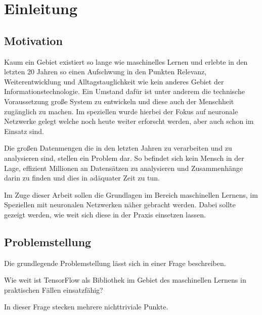 \chapter{Einleitung}
\label{cha:Einleitung}

\section{Motivation}

Kaum ein Gebiet existiert so lange wie maschinelles Lernen und erlebte in den letzten 20 Jahren so einen Aufschwung in den Punkten Relevanz, Weiterentwicklung und Alltagstauglichkeit wie kein anderes Gebiet der Informationstechnologie. 
Ein Umstand dafür ist unter anderem die technische Voraussetzung große System zu entwickeln und diese auch der Menschheit zugänglich zu machen. 
Im speziellen wurde hierbei der Fokus auf neuronale Netzwerke gelegt welche noch heute weiter erforscht werden, aber auch schon im Einsatz sind. \newline

\noindent
Die großen Datenmengen die in den letzten Jahren zu verarbeiten und zu analysieren sind, stellen ein Problem dar. 
So befindet sich kein Mensch in der Lage, effizient Millionen an Datensätzen zu analysieren und Zusammenhänge darin zu finden und dies in adäquater Zeit zu tun. \newline

\noindent
Im Zuge dieser Arbeit sollen die Grundlagen im Bereich maschinellen Lernens, im Speziellen mit neuronalen Netzwerken näher gebracht werden. 
Dabei sollte gezeigt werden, wie weit sich diese in der Praxis einsetzen lassen. 

\section{Problemstellung}

Die grundlegende Problemstellung lässt sich in einer Frage beschreiben. \newline

Wie weit ist TensorFlow als Bibliothek im Gebiet des maschinellen Lernens in praktischen Fällen einsatzfähig? \newline

\noindent
In dieser Frage stecken mehrere nichttriviale Punkte. 

